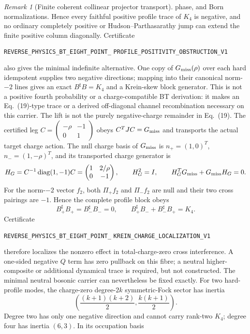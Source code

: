 \documentclass[11pt]{article}
\theoremstyle{definition}
\theoremstyle{remark}
\newtheorem{remark}[theorem]{Remark}
\begin{document}
\begin{remark}[Finite coherent collinear projector transport]
phase, and Born normalizations.  Hence every faithful positive profile trace
of $K_4$ is negative, and no ordinary completely positive or
Hudson--Parthasarathy jump can extend the finite positive column diagonally.
Certificate
\par\noindent
\texttt{REVERSE\_PHYSICS\_BT\_EIGHT\_POINT\_}\allowbreak
\texttt{PROFILE\_POSITIVITY\_OBSTRUCTION\_V1}
\par\noindent
also gives the minimal indefinite alternative.  One copy of
$G_{\rm miss}(\rho)$ over each hard idempotent supplies two negative
directions; mapping into their canonical norm-$-2$ lines gives an exact
$B^\sharp B=K_4$ and a Krein-skew block generator.  This is not a positive
fourth probability or a charge-compatible BT derivation: it makes an
Eq.~(19)-type trace or a derived off-diagonal channel recombination necessary
on this carrier.
The lift is not the purely negative-charge remainder in Eq.~(19).  The
certified leg
$C=\left(\begin{smallmatrix}-\rho&-1\\0&1\end{smallmatrix}\right)$ obeys
$C^TJC=G_{\rm miss}$ and transports the actual target charge action.  The null
charge basis of $G_{\rm miss}$ is
$n_+=(1,0)^T$, $n_-=(1,-\rho)^T$, and its transported charge generator is
\[
 H_G=C^{-1}\operatorname{diag}(1,-1)C
 =\begin{pmatrix}1&2/\rho\\0&-1\end{pmatrix},
 \qquad H_G^2=I,\qquad H_G^TG_{\rm miss}+G_{\rm miss}H_G=0.
\]
For the norm-$-2$ vector $f_2$, both $\Pi_+f_2$ and $\Pi_-f_2$ are null and
their two cross pairings are $-1$.  Hence the complete profile block obeys
\[
 B_+^\sharp B_+=B_-^\sharp B_-=0,\qquad
 B_+^\sharp B_-+B_-^\sharp B_+=K_4.
\]
Certificate
\par\noindent
\texttt{REVERSE\_PHYSICS\_BT\_EIGHT\_POINT\_}\allowbreak
\texttt{KREIN\_CHARGE\_LOCALIZATION\_V1}
\par\noindent
therefore localizes the nonzero effect in total-charge-zero cross
interference.  A one-sided negative $Q$ term has zero pullback on this fibre;
a neutral higher-composite or additional dynamical trace is required, but not
constructed.
The minimal neutral bosonic carrier can nevertheless be fixed exactly.
For two hard-profile modes, the charge-zero degree-$2k$ symmetric-Fock sector
has inertia
\[
 \left(\frac{(k+1)(k+2)}2,\frac{k(k+1)}2\right).
\]
Degree two has only one negative direction and cannot carry rank-two $K_4$;
degree four has inertia $(6,3)$.  In its occupation basis

\end{remark}
\end{document}
